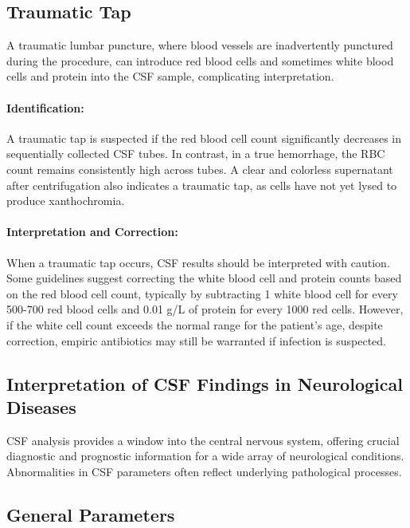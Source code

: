 \subsection{Traumatic Tap}
	
A traumatic lumbar puncture, where blood vessels are inadvertently punctured during the procedure, can introduce red blood cells and sometimes white blood cells and protein into the CSF sample, complicating interpretation.
	
\paragraph{Identification:} A traumatic tap is suspected if the red blood cell count significantly decreases in sequentially collected CSF tubes. In contrast, in a true hemorrhage, the RBC count remains consistently high across tubes. A clear and colorless supernatant after centrifugation also indicates a traumatic tap, as cells have not yet lysed to produce xanthochromia.
	
\paragraph{Interpretation and Correction:} When a traumatic tap occurs, CSF results should be interpreted with caution. Some guidelines suggest correcting the white blood cell and protein counts based on the red blood cell count, typically by subtracting 1 white blood cell for every 500-700 red blood cells and 0.01 g/L of protein for every 1000 red cells. However, if the white cell count exceeds the normal range for the patient's age, despite correction, empiric antibiotics may still be warranted if infection is suspected.
	
\subsection{Interpretation of CSF Findings in Neurological Diseases}
	
CSF analysis provides a window into the central nervous system, offering crucial diagnostic and prognostic information for a wide array of neurological conditions. Abnormalities in CSF parameters often reflect underlying pathological processes.
	
\subsection*{General Parameters}
	
